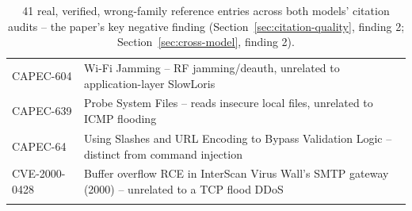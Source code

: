 \documentclass[10pt,twocolumn]{article}
\begin{document}
\begin{longtable}{p{}p{}}
CAPEC-604 & Wi-Fi Jamming -- RF jamming/deauth, unrelated to application-layer SlowLoris \\
CAPEC-639 & Probe System Files -- reads insecure local files, unrelated to ICMP flooding \\
CAPEC-64 & Using Slashes and URL Encoding to Bypass Validation Logic -- distinct from command injection \\
CVE-2000-0428 & Buffer overflow RCE in InterScan Virus Wall's SMTP gateway (2000) -- unrelated to a TCP flood DDoS \\
\bottomrule
\caption{41 real, verified, wrong-family reference entries across both models' citation audits -- the paper's key negative finding (Section~\ref{sec:citation-quality}, finding 2; Section~\ref{sec:cross-model}, finding 2).}
\end{longtable}

\twocolumn
\end{document}
